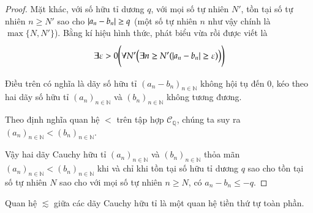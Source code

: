 \begin{proof}
    Mặt khác, với số hữu tỉ dương $q$, với mọi số tự nhiên $N'$, tồn tại số tự nhiên $n\geq N'$ sao cho $\left\vert{a_{n} - b_{n}}\right\vert\geq q$ (một số tự nhiên $n$ như vậy chính là $\max\{ N, N' \}$). Bằng kí hiệu hình thức, phát biểu vừa rồi được viết là
    \[
        \exists \varepsilon > 0\Biggl( \forall N' \bigl( \exists n\geq N'( \left\vert{a_{n} - b_{n}}\right\vert \geq \varepsilon ) \bigr) \Biggr)
    \]

    Điều trên có nghĩa là dãy số hữu tỉ ${(a_{n} - b_{n})}_{n\in\mathbb{N}}$ không hội tụ đến $0$, kéo theo hai dãy số hữu tỉ ${(a_{n})}_{n\in\mathbb{N}}$ và ${(b_{n})}_{n\in\mathbb{N}}$ không tương đương.

    Theo định nghĩa quan hệ $<$ trên tập hợp $\mathscr{C}_{\mathbb{Q}}$, chúng ta suy ra ${(a_{n})}_{n\in\mathbb{N}} < {(b_{n})}_{n\in\mathbb{N}}$.

    \bigskip

    Vậy hai dãy Cauchy hữu tỉ ${(a_{n})}_{n\in\mathbb{N}}$ và ${(b_{n})}_{n\in\mathbb{N}}$ thỏa mãn ${(a_{n})}_{n\in\mathbb{N}} < {(b_{n})}_{n\in\mathbb{N}}$ khi và chỉ khi tồn tại số hữu tỉ dương $q$ sao cho tồn tại số tự nhiên $N$ sao cho với mọi số tự nhiên $n\geq N$, có $a_{n} - b_{n}\leq -q$.
\end{proof}

\begin{theorem}
    Quan hệ $\lesssim$ giữa các dãy Cauchy hữu tỉ là một quan hệ tiền thứ tự toàn phần.
\end{theorem}


